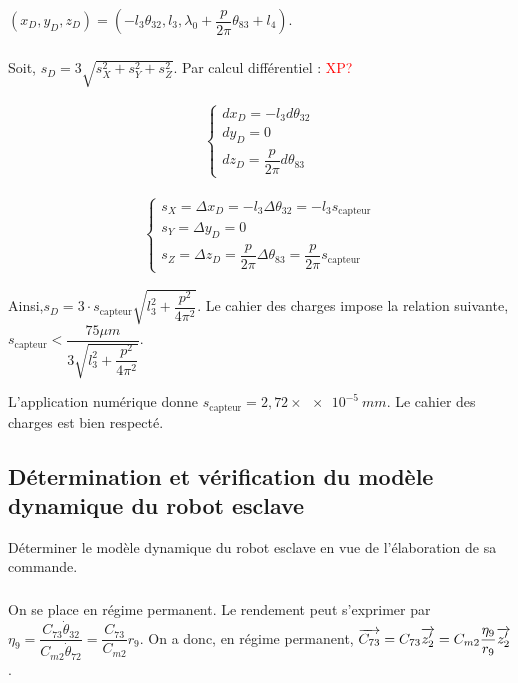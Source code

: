 \documentclass[10pt,fleqn]{article} %
\begin{document}
  $\left(x_D,y_D,z_D\right)=
\left(-l_3 \theta_{32},l_3, \lambda_0 + \dfrac{p}{2\pi} \theta_{83} +l_4\right)$.

\subparagraph{}%

Soit, $s_D=3\sqrt{s_X^2+s_Y^2+s_Z^2}$. Par calcul différentiel :  \textcolor{red}{XP?}

\begin{minipage}{0.5\textwidth}
\begin{align*}
\left\{
\begin{array}{c}
dx_D=-l_3d\theta_{32}\\
dy_D=0\\
dz_D=\dfrac{p}{2\pi}d\theta_{83}
\end{array}
\right.
\end{align*}
\end{minipage}
\begin{minipage}{0.5\textwidth}

\begin{align*}
\left\{
\begin{array}{c}
s_X=\Delta x_D=-l_3\Delta \theta_{32}=-l_3 s_{\text{capteur}}\\
s_Y=\Delta y_D=0\\
s_Z=\Delta z_D=\dfrac{p}{2\pi}\Delta \theta_{83}=\dfrac{p}{2\pi}s_{\text{capteur}}
\end{array}
\right.
\end{align*}
\end{minipage}

Ainsi,$
s_D=3\cdot s_{\text{capteur}}\sqrt{l_3^2+\dfrac{p^2}{4\pi^2}}
$.
Le cahier des charges impose la relation suivante,$
s_{\text{capteur}}<\dfrac{75\mu m}{3\sqrt{l_3^2+\dfrac{p^2}{4\pi^2}}}
$.

L'application numérique donne $s_{\text{capteur}}=2,72\times \SI{e-5}{mm}$. Le cahier des charges est bien respecté.


\subsection{Détermination et vérification du modèle dynamique du robot esclave}
\begin{obj}
Déterminer le modèle dynamique du robot esclave en vue de l’élaboration de sa commande.
\end{obj}

\subparagraph{}%
On se place en régime permanent. Le rendement peut s'exprimer par 
$\eta_9 =\dfrac{C_{73}\dot{\theta}_{32}}{C_{m2}\dot{\theta}_{72}}=\dfrac{C_{73}}{C_{m2}}r_9$. 
On a donc, en régime permanent, $\overrightarrow{C_{73}}=C_{73}\overrightarrow{z'_2}=C_{m2}\dfrac{\eta_9}{r_9}\overrightarrow{z'_2}$.
\end{document}
